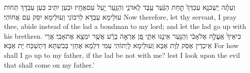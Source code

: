 {וְעַתָּ֗ה יֵֽשֶׁב\maqqaf נָ֤א עַבְדְּךָ֙ תַּ֣חַת הַנַּ֔עַר עֶ֖בֶד לַֽאדֹנִ֑י וְהַנַּ֖עַר יַ֥עַל עִם\maqqaf אֶחָֽיו׃}
{וּכְעַן יִתֵּיב כְּעַן עַבְדָּךְ תְּחוֹת עוּלֵימָא עַבְדָּא לְרִבּוֹנִי וְעוּלֵימָא יִסַּק עִם אֲחוֹהִי׃}
{Now therefore, let thy servant, I pray thee, abide instead of the lad a bondman to my lord; and let the lad go up with his brethren.}{}
{כִּי\maqqaf אֵיךְ֙ אֶֽעֱלֶ֣ה אֶל\maqqaf אָבִ֔י וְהַנַּ֖עַר אֵינֶ֣נּוּ אִתִּ֑י פֶּ֚ן אֶרְאֶ֣ה בָרָ֔ע אֲשֶׁ֥ר יִמְצָ֖א אֶת\maqqaf אָבִֽי׃}
{אֲרֵי אֵיכְדֵין אֶסַּק לְוָת אַבָּא וְעוּלֵימָא לָיְתוֹהִי עִמִּי דִּלְמָא אֶחְזֵי בְּבִשְׁתָּא דְּתַשְׁכַּח יָת אַבָּא׃}
{For how shall I go up to my father, if the lad be not with me? lest I look upon the evil that shall come on my father.’}{}

